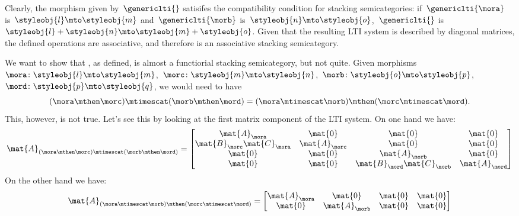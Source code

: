 Clearly, the morphism given by~$\genericlti{}$ satisifes the compatibility condition for stacking semicategories:
if~$\genericlti{\mora}$ is~$\styleobj{l}\mto \styleobj{m}$ and~$\genericlti{\morb}$ is~$\styleobj{n}\mto \styleobj{o}$,~$\genericlti{}$ is~$\styleobj{l}+\styleobj{n}\mto \styleobj{m}+\styleobj{o}$.
Given that the resulting LTI system is described by diagonal matrices, the defined operations are associative, and therefore \LTI is an associative stacking semicategory.

\begin{example}
    We want to show that \LTI, as defined, is almost a functiorial stacking semicategory, but not quite.
    Given morphisms~$\mora\colon \styleobj{l}\mto \styleobj{m}$,~$\morc\colon \styleobj{m}\mto \styleobj{n}$,~$\morb\colon \styleobj{o}\mto \styleobj{p}$,~$\mord\colon \styleobj{p}\mto \styleobj{q}$, we would need to have
    \begin{equation*}
        (\mora \mthen \morc)\mtimescat (\morb\mthen \mord)=(\mora\mtimescat \morb)\mthen (\morc\mtimescat \mord).
    \end{equation*}
    This, however, is not true.
    Let's see this by looking at the first matrix component of the LTI system.
    On one hand we have:
    \begin{equation*}
        \mat{A}_{(\mora \mthen \morc)\mtimescat (\morb\mthen \mord)}=
        \begin{bmatrix}
            \mat{A}_\mora              & \mat{0}       & \mat{0}                    & \mat{0}       \\
            \mat{B}_\morc\mat{C}_\mora & \mat{A}_\morc & \mat{0}                    & \mat{0}       \\
            \mat{0}                    & \mat{0}       & \mat{A}_\morb              & \mat{0}       \\
            \mat{0}                    & \mat{0}       & \mat{B}_\mord\mat{C}_\morb & \mat{A}_\mord
        \end{bmatrix}
    \end{equation*}
    On the other hand we have:
    \begin{equation*}
        \mat{A}_{(\mora\mtimescat \morb)\mthen (\morc\mtimescat \mord)}=
        \begin{bmatrix}
            \mat{A}_\mora               & \mat{0}                     & \mat{0}       & \mat{0}       \\
            \mat{0}                     & \mat{A}_\morb               & \mat{0}       & \mat{0}       \\

\end{bmatrix}
\end{equation*}
\end{example}
